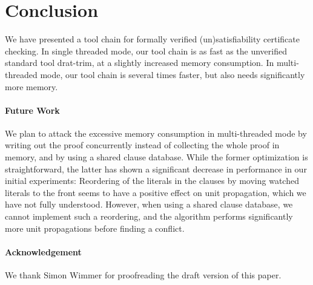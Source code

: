 \documentclass{llncs}
\begin{document}
\section{Conclusion}
We have presented a tool chain for formally verified (un)satisfiability certificate checking.
In single threaded mode, our tool chain is as fast as the unverified standard tool drat-trim, at a slightly increased memory consumption.
In multi-threaded mode, our tool chain is several times faster, but also needs significantly more memory.

\paragraph{Future Work}
We plan to attack the excessive memory consumption in multi-threaded mode by writing out the proof concurrently instead of collecting the whole proof in memory,
and by using a shared clause database. While the former optimization is straightforward, the latter has shown a significant decrease 
in performance in our initial experiments: Reordering of the literals in the clauses by moving watched literals to the front seems to have a positive effect on 
unit propagation, which we have not fully understood. However, when using a shared clause database, we cannot implement such a reordering, and the algorithm 
performs significantly more unit propagations before finding a conflict.

\paragraph{Acknowledgement}
We thank Simon Wimmer for proofreading the draft version of this paper.
\end{document}
